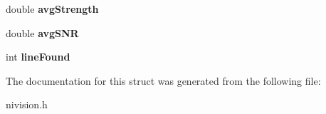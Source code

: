 \begin{DoxyCompactItemize}
\item 
\hypertarget{structFindConcentricEdgeReport__struct_addaaa44ac59a2ef3b73e876f1293affb}{
double {\bfseries avgStrength}}
\label{structFindConcentricEdgeReport__struct_addaaa44ac59a2ef3b73e876f1293affb}

\item 
\hypertarget{structFindConcentricEdgeReport__struct_a51d9f09cc6c91d6a6b05c7e0eaa70b13}{
double {\bfseries avgSNR}}
\label{structFindConcentricEdgeReport__struct_a51d9f09cc6c91d6a6b05c7e0eaa70b13}

\item 
\hypertarget{structFindConcentricEdgeReport__struct_a26e903bf70f4d0af53b28d43c8bcc57d}{
int {\bfseries lineFound}}
\label{structFindConcentricEdgeReport__struct_a26e903bf70f4d0af53b28d43c8bcc57d}

\end{DoxyCompactItemize}


The documentation for this struct was generated from the following file:\begin{DoxyCompactItemize}
\item 
nivision.h\end{DoxyCompactItemize}
